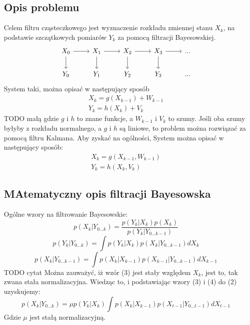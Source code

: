 \documentclass[10pt,a4paper]{article}
\begin{document}
\subsection{Opis problemu}
Celem filtru cząsteczkowego jest wyznaczenie rozkładu zmiennej stanu $X_k$, na podstawie szczątkowych pomiarów $Y_k$ za pomocą filtracji Bayesowskiej. \\
\begin{equation*}
\begin{tikzcd}
	X_0 \arrow{r} \arrow{d} &X_1 \arrow{r} \arrow{d} &X_2 \arrow{r} \arrow{d} &X_3\arrow{r} \arrow{d} &...\\
	Y_0 &Y_1 &Y_2 &Y_3 &...
\end{tikzcd} 
\end{equation*}
System taki, można opisać w następujący sposób
\begin{equation*}
	\begin{aligned}
		X_k=g(X_{k-1})+W_{k-1} \\
		Y_k=h(X_k)+V_k
	\end{aligned}
\end{equation*}
TODO małą gdzie $g$ i $h$ to znane funkcje, a $W_{k-1}$ i $V_k$ to szumy. Jeśli oba szumy byłyby z rozkładu normalnego, a $g$ i $h$ są liniowe, to problem można rozwiązać za pomocą filtru Kalmana. Aby zyskać na ogólności, System można opisać w następujący sposób:
\begin{equation}
	\begin{aligned}
		X_k=g(X_{k-1}, W_{k-1}) \\
		Y_k=h(X_k, V_k)
	\end{aligned}
\end{equation}

\subsection{MAtematyczny opis filtracji Bayesowska}
Ogólne wzory na filtrowanie Bayesowskie:
\begin{equation}
	p(X_k|Y_{0...k})=\frac{p(Y_k|X_k)p(X_k)}{p(Y_k|Y_{0...k-1})}
\end{equation}
\begin{equation}
p(Y_k|Y_{0...k})=\int p(Y_k|X_k)p(X_k|Y_{0...k-1}) dX_k
\end{equation}
\begin{equation}
p(X_k|Y_{0...k-1})=\int p(X_k|X_{k-1})p(X_{k-1}|Y_{0...k-1}) dX_{k-1}
\end{equation}
TODO cytat
Można zauważyć, iż wzór (3) jest stały względem $X_k$, jest to, tak zwana stała normalizacyjna. Wiedząc to, i podstawiając wzory (3) i (4) do (2) uzyskujemy:
\begin{equation}
	p(X_k|Y_{0...k})=\mu p(Y_k|X_k)\int p(X_k|X_{k-1})p(X_{t-1}|Y_{0...t-1}) dX_{t-1}
\end{equation}
Gdzie $\mu$ jest stałą normalizacyjną.
\end{document}
